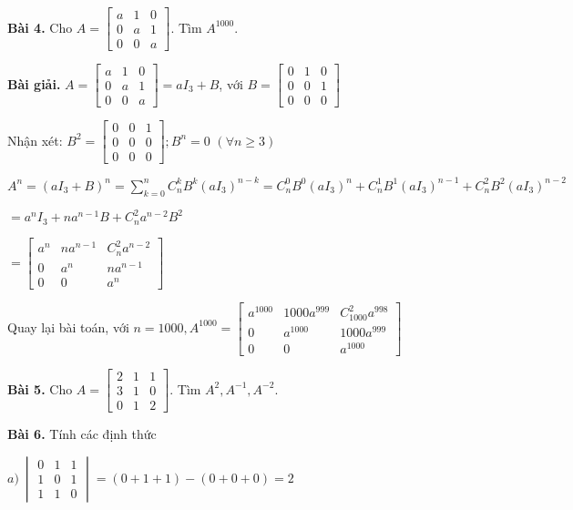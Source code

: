 \documentclass[12pt]{report}
\begin{document}
\textbf{Bài 4.} Cho $A = \begin{bmatrix} a & 1 & 0 \\ 0 & a & 1 \\ 0 & 0 & a \end{bmatrix}$. Tìm $A^{1000}$.

\textbf{Bài giải.} $A = \begin{bmatrix} a & 1 & 0 \\ 0 & a & 1 \\ 0 & 0 & a \end{bmatrix} = aI_3 + B$, với $B = \begin{bmatrix} 0 & 1 & 0 \\ 0 & 0 & 1 \\ 0 & 0 & 0 \end{bmatrix}$

Nhận xét: $B^2 = \begin{bmatrix} 0 & 0 & 1 \\ 0 & 0 & 0 \\ 0 & 0 & 0 \end{bmatrix}; B^n = 0$  $(\forall n \geq 3)$

$A^n = (aI_3+B)^n = \displaystyle\sum_{k=0}^{n} C_n^k B^k (aI_3)^{n-k} = C_n^0 B^0 (aI_3)^n + C_n^1 B^1 (aI_3)^{n-1} + C_n^2 B^2 (aI_3)^{n-2}$

$= a^nI_3 +na^{n-1}B + C_n^2 a^{n-2} B^2$

$= \begin{bmatrix} a^n & na^{n-1} & C_n^2a^{n-2} \\ 0 & a^n & na^{n-1} \\ 0 & 0 & a^n \end{bmatrix}$

Quay lại bài toán, với $n = 1000, A^{1000} = \begin{bmatrix} a^{1000} & 1000a^{999} & C_{1000}^2 a^{998} \\[6pt] 0 & a^{1000} & 1000a^{999} \\[6pt] 0 & 0 & a^{1000} \end{bmatrix}$

\textbf{Bài 5.} Cho $A = \begin{bmatrix} 2 & 1 & 1 \\ 3 & 1 & 0 \\ 0 & 1 & 2 \end{bmatrix}$. Tìm $A^2, A^{-1}, A^{-2}$.

\textbf{Bài 6.} Tính các định thức

$a)\ \begin{vmatrix} 0 & 1 & 1 \\ 1 & 0 & 1 \\ 1 & 1 & 0 \end{vmatrix} = (0 + 1 + 1) - (0 + 0 + 0) = 2$
\end{document}
